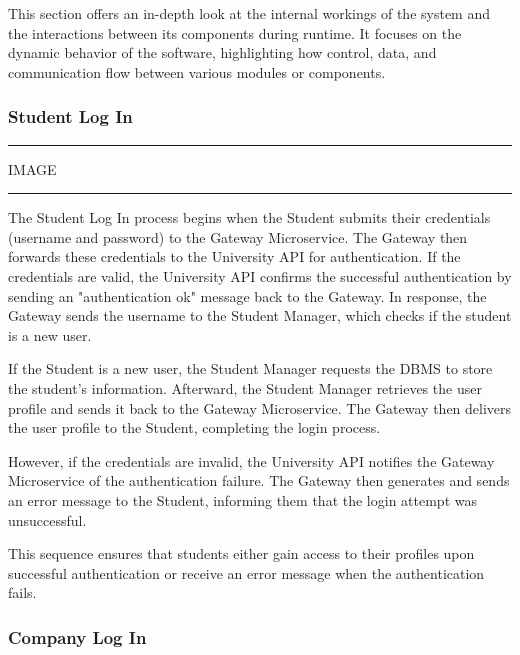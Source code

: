This section offers an in-depth look at the internal workings of the system and the interactions between its components during runtime. It focuses on the dynamic behavior of the software, highlighting how control, data, and communication flow between various modules or components.

\subsubsection{Student Log In}

\vspace{20pt}
\hrule
\vspace{10pt}
IMAGE
\vspace{10pt}
\hrule
\vspace{20pt}

The Student Log In process begins when the Student submits their credentials (username and password) to the Gateway Microservice. The Gateway then forwards these credentials to the University API for authentication. If the credentials are valid, the University API confirms the successful authentication by sending an "authentication ok" message back to the Gateway. In response, the Gateway sends the username to the Student Manager, which checks if the student is a new user.

If the Student is a new user, the Student Manager requests the DBMS to store the student's information. Afterward, the Student Manager retrieves the user profile and sends it back to the Gateway Microservice. The Gateway then delivers the user profile to the Student, completing the login process.

However, if the credentials are invalid, the University API notifies the Gateway Microservice of the authentication failure. The Gateway then generates and sends an error message to the Student, informing them that the login attempt was unsuccessful.

This sequence ensures that students either gain access to their profiles upon successful authentication or receive an error message when the authentication fails.

\subsubsection{Company Log In}

